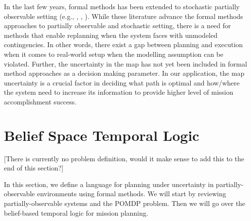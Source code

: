 \documentclass[conference]{IEEEtran}
\begin{document}
	In the last few years, formal methods has been extended to stochastic partially observable setting (e.g., \cite{Cristi-CDC-2016}, \cite{dorsa-rss2016}, \cite{fu2015integrating}). While these literature advance the formal methods approaches to partially observable and stochastic setting, there is a need for methods that enable replanning when the system faces with unmodeled contingencies. In other words, there exist a gap between planning and execution when it comes to real-world setup when the modelling assumption can be violated. Further, the uncertainty in the map has not yet been included in formal method approaches as a decision making parameter. In our application, the map uncertainty is a crucial factor in deciding what path is optimal and how/where the system need to increase its information to provide higher level of mission accomplishment success.
	
	\section{Belief Space Temporal Logic}
    {\color{red} [There is currently no problem definition, would it make sense to add this to the end of this section?]}
    
	In this section, we define a language for planning under uncertainty in partially-observable environments using formal methods. We will start by reviewing partially-observable systems and the POMDP problem. Then we will go over the belief-based temporal logic for mission planning.
	
\end{document}
